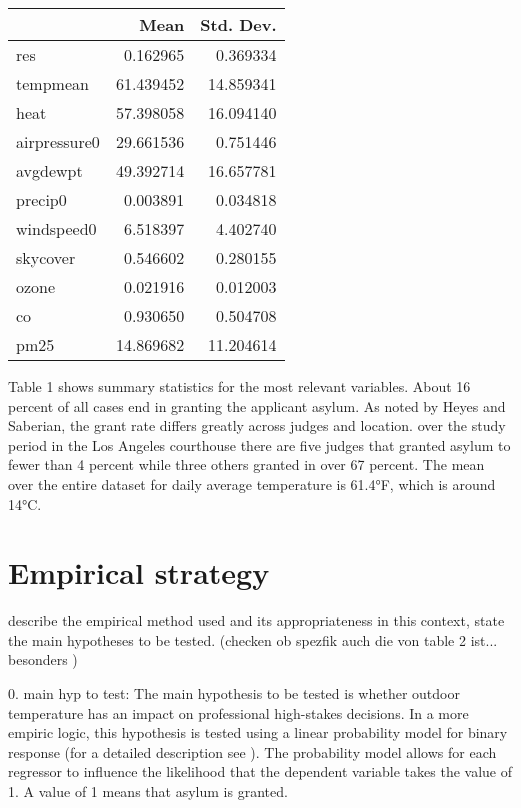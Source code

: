 \documentclass[11pt]{article}
\begin{document}
	\begin{center}
	 \label{tab:title}
	\begin{tabular}{lrr}
		\toprule
		{} &       Mean &  Std. Dev. \\
		\midrule
		res          &   0.162965 &   0.369334 \\
		tempmean     &  61.439452 &  14.859341 \\
		heat         &  57.398058 &  16.094140 \\
		airpressure0 &  29.661536 &   0.751446 \\
		avgdewpt     &  49.392714 &  16.657781 \\
		precip0      &   0.003891 &   0.034818 \\
		windspeed0   &   6.518397 &   4.402740 \\
		skycover     &   0.546602 &   0.280155 \\
		ozone        &   0.021916 &   0.012003 \\
		co           &   0.930650 &   0.504708 \\
		pm25         &  14.869682 &  11.204614 \\
		\bottomrule
	\end{tabular}
	\end{center}
	
	Table 1 shows summary statistics for the most relevant variables. About 16 percent of all cases end in granting the applicant asylum. As noted by Heyes and Saberian, the grant rate differs greatly across judges and location. over the study period in the Los Angeles courthouse there are five judges that granted asylum to fewer than 4 percent while three others granted in over 67 percent. The mean over the entire dataset for daily average temperature is 61.4°F, which is around 14°C.
	\section{Empirical strategy}
	\textit{}describe the empirical method used and its appropriateness in this context, state the main hypotheses to be tested. (checken ob spezfik auch die von table 2 ist... besonders )
	
	0. main hyp to test:
	The main hypothesis to be tested is whether outdoor temperature has an impact on professional high-stakes decisions. In a more empiric logic, this hypothesis is tested using a linear probability model for binary response (for a detailed description see \cite{wooldridge2010econometric}). The probability model allows for each regressor to influence the likelihood that the dependent variable takes the value of 1. A value of 1 means that asylum is granted.
\end{document}
